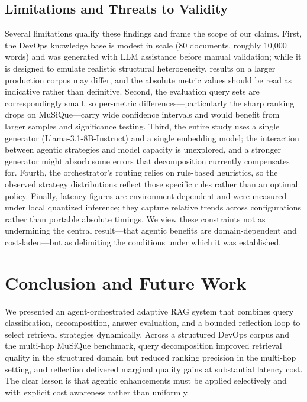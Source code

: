 \documentclass[conference]{IEEEtran}
\begin{document}
\subsection{Limitations and Threats to Validity}
Several limitations qualify these findings and frame the scope of our claims. First, the DevOps knowledge base is modest in scale (80 documents, roughly 10{,}000 words) and was generated with LLM assistance before manual validation; while it is designed to emulate realistic structural heterogeneity, results on a larger production corpus may differ, and the absolute metric values should be read as indicative rather than definitive. Second, the evaluation query sets are correspondingly small, so per-metric differences---particularly the sharp ranking drops on MuSiQue---carry wide confidence intervals and would benefit from larger samples and significance testing. Third, the entire study uses a single generator (Llama-3.1-8B-Instruct) and a single embedding model; the interaction between agentic strategies and model capacity is unexplored, and a stronger generator might absorb some errors that decomposition currently compensates for. Fourth, the orchestrator's routing relies on rule-based heuristics, so the observed strategy distributions reflect those specific rules rather than an optimal policy. Finally, latency figures are environment-dependent and were measured under local quantized inference; they capture relative trends across configurations rather than portable absolute timings. We view these constraints not as undermining the central result---that agentic benefits are domain-dependent and cost-laden---but as delimiting the conditions under which it was established.

\section{Conclusion and Future Work}
We presented an agent-orchestrated adaptive RAG system that combines query classification, decomposition, answer evaluation, and a bounded reflection loop to select retrieval strategies dynamically. Across a structured DevOps corpus and the multi-hop MuSiQue benchmark, query decomposition improved retrieval quality in the structured domain but reduced ranking precision in the multi-hop setting, and reflection delivered marginal quality gains at substantial latency cost. The clear lesson is that agentic enhancements must be applied selectively and with explicit cost awareness rather than uniformly.
\end{document}

